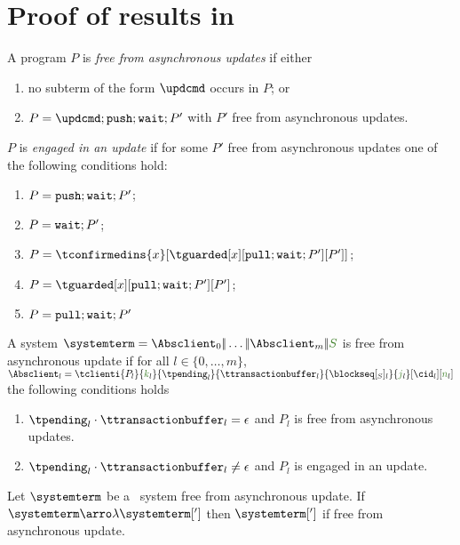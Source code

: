 
\section{Proof of results in }
\label{appendix-transaction}

\begin{definition}
A program $P$ is {\em free from asynchronous updates} if either
\begin{enumerate}
\item  no subterm of the form $\updcmd$ occurs in $P$; or 
\item  $P=\updcmd;\pushcmd;\waitcmd;P'$ with $P'$ free from asynchronous updates.
\end{enumerate}

$P$ is {\em engaged in an update} if for some $P'$ free from asynchronous updates 
one of the following conditions hold:
\begin{enumerate}
\item $P = {\tt push};{\tt wait};P'$;
\item $P = {\tt wait};P'$; 
\item $P = {\tconfirmedins{x}[{\tguarded[x][\pullcmd;\waitcmd;P'][P']}]}$;
\item $P = \tguarded[x][\pullcmd;\waitcmd;P'][P']$;
\item $P = {\tt pull};{\tt wait};P' $  
\end{enumerate}

A system $\systemterm =  \Absclient_0\bigpar \ldots\bigpar \Absclient_m\bigpar\queuemessage$
is free from asynchronous update if for all  $l\in \{0,\ldots,m\}$, 
$\Absclient_l = \tclienti{\tprogram_l}{\tknown_l}{\tpending_l}{\ttransactionbuffer_l}{\tsent_l}{\treceivebuffer_l}[\cid_l][\trounds_l]$ 
 the following conditions holds
 \begin{enumerate}
  \item $\tpending_l\cdot{\ttransactionbuffer_l} = \epsilon$ and $P_l$ is free from asynchronous updates.
  \item $\tpending_l\cdot{\ttransactionbuffer_l} \neq \epsilon$ and $P_l$ is engaged in an update.
\end{enumerate}
\end{definition}
 

\begin{lemma}\label{lemma:empty_queue} 
Let $\systemterm$  be a \gsp\ system free from asynchronous update. If $\systemterm\arroi{\lambda}\systemterm[']$ 
then $\systemterm[']$ if free from asynchronous update. 
\end{lemma}

